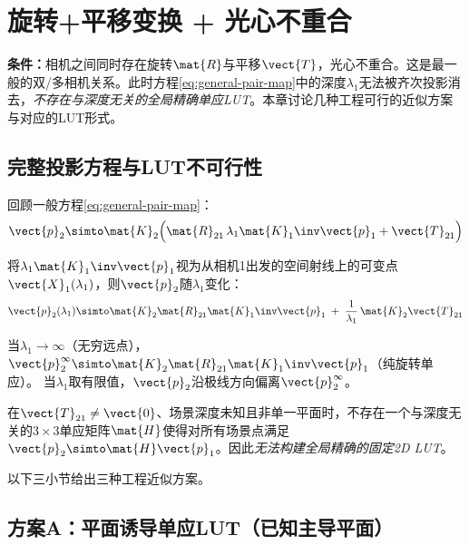 \section{旋转+平移变换 + 光心不重合}
\label{sec:rt-general}

\textbf{条件：}相机之间同时存在旋转$\mat{R}$与平移$\vect{T}$，光心不重合。这是最一般的双/多相机关系。此时方程\eqref{eq:general-pair-map}中的深度$\lambda_1$无法被齐次投影消去，\emph{不存在与深度无关的全局精确单应LUT}。本章讨论几种工程可行的近似方案与对应的LUT形式。

\subsection{完整投影方程与LUT不可行性}
\label{sec:rt-general-eq}

回顾一般方程\eqref{eq:general-pair-map}：
\begin{equation}
\vect{p}_2 \simto \mat{K}_2\Bigl(\mat{R}_{21}\,\lambda_1\mat{K}_1\inv\vect{p}_1 + \vect{T}_{21}\Bigr)
\label{eq:rt-full}
\end{equation}

将$\lambda_1\mat{K}_1\inv\vect{p}_1$视为从相机1出发的空间射线上的可变点$\vect{X}_1(\lambda_1)$，则$\vect{p}_2$随$\lambda_1$变化：
\begin{equation}
\vect{p}_2(\lambda_1) \simto
\mat{K}_2\mat{R}_{21}\mat{K}_1\inv\vect{p}_1
\;+\;
\frac{1}{\lambda_1}\,\mat{K}_2\vect{T}_{21}
\label{eq:rt-epipolar}
\end{equation}

当$\lambda_1 \to \infty$（无穷远点），$\vect{p}_2^\infty \simto \mat{K}_2\mat{R}_{21}\mat{K}_1\inv\vect{p}_1$（纯旋转单应）。
当$\lambda_1$取有限值，$\vect{p}_2$沿极线方向偏离$\vect{p}_2^\infty$。

\begin{theorem}[LUT不可行性]
在$\vect{T}_{21} \neq \vect{0}$、场景深度未知且非单一平面时，不存在一个与深度无关的$3\times 3$单应矩阵$\mat{H}$使得对所有场景点满足$\vect{p}_2 \simto \mat{H}\vect{p}_1$。因此\emph{无法构建全局精确的固定2D LUT}。
\end{theorem}

以下三小节给出三种工程近似方案。

\subsection{方案A：平面诱导单应LUT（已知主导平面）}
\label{sec:rt-plane}

